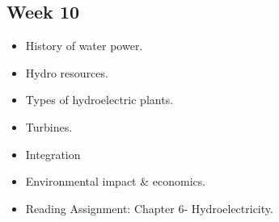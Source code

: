 \documentclass[11pt]{article}
\begin{document}
	\subsection*{Week 10}
	\begin{itemize}
	  \item History of water power.
	    \item Hydro resources.
	    \item Types of hydroelectric plants.
	    \item Turbines.
	    \item Integration 
	    \item Environmental impact \& economics.
	    \item Reading Assignment: Chapter 6- Hydroelectricity.
	\end{itemize}
	
  

\end{document}
